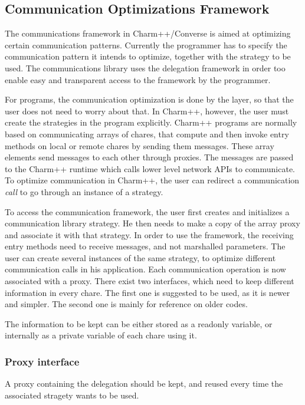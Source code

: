 \subsection{Communication Optimizations Framework}

The communications framework in Charm++/Converse is aimed at optimizing certain
communication patterns. Currently the programmer has to specify the
communication pattern it intends to optimize, together with the strategy to be
used. The communications library uses the delegation framework in order too
enable easy and transparent access to the framework by the programmer.

For \ampi{} programs, the communication optimization is done by the \ampi{}
layer, so that the user does not need to worry about that. In Charm++, however,
the user must create the strategies in the program explicitly. Charm++ programs
are normally based on communicating arrays of chares, that compute and then
invoke entry methods on local or remote chares by sending them messages. These
array elements send messages to each other through proxies. The messages are
passed to the Charm++ runtime which calls lower level network APIs to
communicate. To optimize communication in Charm++, the user can redirect a
communication {\em call} to go through an instance of a strategy.

To access the communication framework, the user first creates and initializes a
communication library strategy. He then needs to make a copy of the array proxy
and associate it with that strategy. In order to use the framework, the
receiving entry methods need to receive messages, and not marshalled parameters.
The user can create several instances of the same strategy, to optimize
different communication calls in his application. Each communication operation
is now associated with a proxy. There exist two interfaces, which need to keep
different information in every chare. The first one is suggested to be used, as
it is newer and simpler. The second one is mainly for reference on older codes.

The information to be kept can be either stored as a readonly variable, or
internally as a private variable of each chare using it.

\subsubsection{Proxy interface}

A proxy containing the delegation should be kept, and reused every time the
associated stragety wants to be used.

